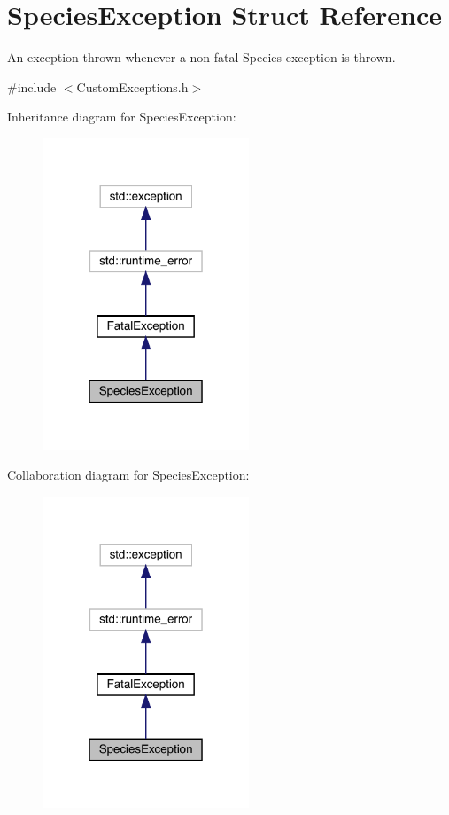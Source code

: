 \hypertarget{struct_species_exception}{}\section{Species\+Exception Struct Reference}
\label{struct_species_exception}


An exception thrown whenever a non-\/fatal Species exception is thrown.  




{\ttfamily \#include $<$Custom\+Exceptions.\+h$>$}



Inheritance diagram for Species\+Exception\+:\nopagebreak
\begin{figure}[H]
\begin{center}
\leavevmode
\includegraphics[width=175pt]{struct_species_exception__inherit__graph}
\end{center}
\end{figure}


Collaboration diagram for Species\+Exception\+:\nopagebreak
\begin{figure}[H]
\begin{center}
\leavevmode
\includegraphics[width=175pt]{struct_species_exception__coll__graph}
\end{center}
\end{figure}
